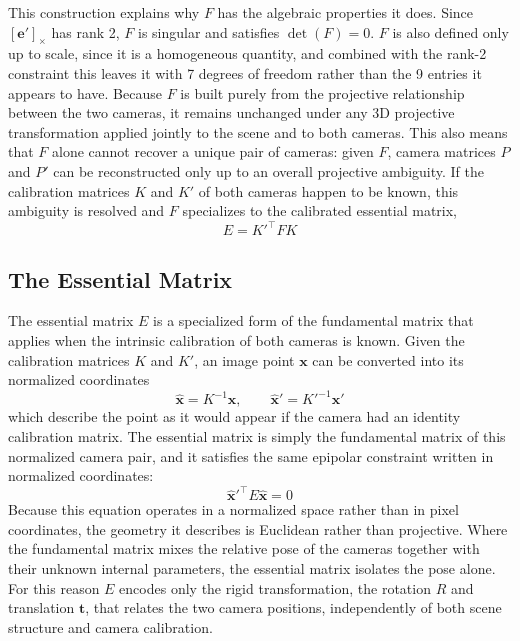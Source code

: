 This construction explains why $F$ has the algebraic properties it does. Since $[\mathbf{e}']_\times$ has rank 2, $F$ is singular and satisfies $\det(F) = 0$. $F$ is also defined only up to scale, since it is a homogeneous quantity, and combined with the rank-2 constraint this leaves it with 7 degrees of freedom rather than the 9 entries it appears to have. Because $F$ is built purely from the projective relationship between the two cameras, it remains unchanged under any 3D projective transformation applied jointly to the scene and to both cameras. This also means that $F$ alone cannot recover a unique pair of cameras: given $F$, camera matrices $P$ and $P'$ can be reconstructed only up to an overall projective ambiguity. If the calibration matrices $K$ and $K'$ of both cameras happen to be known, this ambiguity is resolved and $F$ specializes to the calibrated essential matrix,
\begin{equation}
    E = K'^\top F K
\end{equation}

\subsection{The Essential Matrix}

The essential matrix $E$ is a specialized form of the fundamental matrix that applies when the intrinsic calibration of both cameras is known. Given the calibration matrices $K$ and $K'$, an image point $\mathbf{x}$ can be converted into its normalized coordinates
\begin{equation}
    \hat{\mathbf{x}} = K^{-1}\mathbf{x}, \qquad \hat{\mathbf{x}}' = K'^{-1}\mathbf{x}'
\end{equation}
which describe the point as it would appear if the camera had an identity calibration matrix. The essential matrix is simply the fundamental matrix of this normalized camera pair, and it satisfies the same epipolar constraint written in normalized coordinates:
\begin{equation}
    \hat{\mathbf{x}}'^\top E \hat{\mathbf{x}} = 0
\end{equation}
Because this equation operates in a normalized space rather than in pixel coordinates, the geometry it describes is Euclidean rather than projective. Where the fundamental matrix mixes the relative pose of the cameras together with their unknown internal parameters, the essential matrix isolates the pose alone. For this reason $E$ encodes only the rigid transformation, the rotation $R$ and translation $\mathbf{t}$, that relates the two camera positions, independently of both scene structure and camera calibration.

